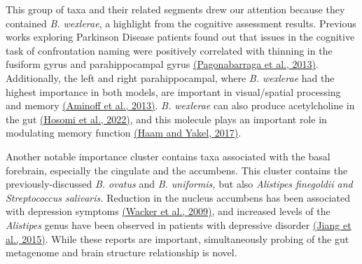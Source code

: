 \documentclass[
]{article}
\begin{document}
This group of taxa and their related segments drew our attention because
they contained \emph{B. wexlerae}, a highlight from the cognitive
assessment results. Previous works exploring Parkinson Disease patients
found out that issues in the cognitive task of confrontation naming were
positively correlated with thinning in the fusiform gyrus and
parahippocampal gyrus
\href{https://www.zotero.org/google-docs/?rlO6eq}{(Pagonabarraga et al.,
2013)}. Additionally, the left and right parahippocampal, where \emph{B.
wexlerae} had the highest importance in both models, are important in
visual/spatial processing and memory
\href{https://www.zotero.org/google-docs/?wkkWZT}{(Aminoff et al.,
2013)}. \emph{B. wexlerae} can also produce acetylcholine in the gut
\href{https://www.zotero.org/google-docs/?jBoxSm}{(Hosomi et al.,
2022)}, and this molecule plays an important role in modulating memory
function \href{https://www.zotero.org/google-docs/?BQ0j2c}{(Haam and
Yakel, 2017)}.

Another notable importance cluster contains taxa associated with the
basal forebrain, especially the cingulate and the accumbens. This
cluster contains the previously-discussed \emph{B. ovatus} and \emph{B.
uniformis,} but also \emph{Alistipes finegoldii and Streptococcus
salivaris.} Reduction in the nucleus accumbens has been associated with
depression symptoms
\href{https://www.zotero.org/google-docs/?2aSZIr}{(Wacker et al.,
2009)}, and increased levels of the \emph{Alistipes} genus have been
observed in patients with depressive disorder
\href{https://www.zotero.org/google-docs/?bhhSZB}{(Jiang et al., 2015)}.
While these reports are important, simultaneously probing of the gut
metagenome and brain structure relationship is novel.
\end{document}
